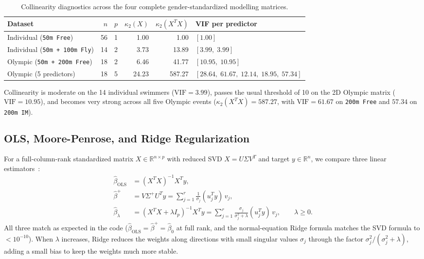 \documentclass[11pt, a4paper]{article}
\begin{document}
\begin{table}[H]
    \centering
    \small
    \renewcommand{\arraystretch}{1.2}
    \begin{tabularx}{\textwidth}{@{}l r r r r >{\raggedright\arraybackslash}X@{}}
        \toprule
        \textbf{Dataset} & $n$ & $p$ & $\kappa_2(X)$ & $\kappa_2(X^T X)$ & \textbf{VIF per predictor} \\
        \midrule
        Individual (\texttt{50m Free}) & 56 & 1 & 1.00 & 1.00 & $[1.00]$ \\
        Individual (\texttt{50m + 100m Fly}) & 14 & 2 & 3.73 & 13.89 & $[3.99,\; 3.99]$ \\
        Olympic (\texttt{50m + 200m Free}) & 18 & 2 & 6.46 & 41.77 & $[10.95,\; 10.95]$ \\
        Olympic (5 predictors) & 18 & 5 & 24.23 & 587.27 & $[28.64,\; 61.67,\; 12.14,\; 18.95,\; 57.34]$ \\
        \bottomrule
    \end{tabularx}
    \caption{Collinearity diagnostics across the four complete gender-standardized modelling matrices.}
    \label{tab:phase3_collinearity}
\end{table}

\noindent Collinearity is moderate on the 14 individual swimmers ($\text{VIF} = 3.99$), passes the usual threshold of 10 on the 2D Olympic matrix ($\text{VIF} = 10.95$), and becomes very strong across all five Olympic events ($\kappa_2(X^T X) = 587.27$, with $\text{VIF} = 61.67$ on \texttt{200m Free} and $57.34$ on \texttt{200m IM}).

\subsection{OLS, Moore-Penrose, and Ridge Regularization}

For a full-column-rank standardized matrix $X \in \mathbb{R}^{n \times p}$ with reduced SVD $X = U\Sigma V^T$ and target $y \in \mathbb{R}^n$, we compare three linear estimators~\cite{hastie2009, deisenroth2020}:
\begin{align}
    \hat{\beta}_{\text{OLS}} &= (X^T X)^{-1} X^T y, \\
    \hat{\beta}^{+} &= V \Sigma^+ U^T y = \sum_{j=1}^{r} \frac{1}{\sigma_j} (u_j^T y)\, v_j, \\
    \hat{\beta}_{\lambda} &= (X^T X + \lambda I_p)^{-1} X^T y = \sum_{j=1}^{r} \frac{\sigma_j}{\sigma_j^2 + \lambda} (u_j^T y)\, v_j, \qquad \lambda \ge 0.
\end{align}
All three match as expected in the code ($\hat{\beta}_{\text{OLS}} = \hat{\beta}^{+} = \hat{\beta}_{0}$ at full rank, and the normal-equation Ridge formula matches the SVD formula to $< 10^{-10}$). When $\lambda$ increases, Ridge reduces the weights along directions with small singular values $\sigma_j$ through the factor $\sigma_j^2 / (\sigma_j^2 + \lambda)$, adding a small bias to keep the weights much more stable.
\end{document}
